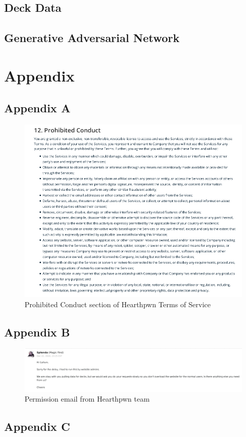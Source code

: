 \documentclass{report} %
\begin{document}
\section{Deck Data}
\section{Generative Adversarial Network}


\chapter{Appendix}
\section*{Appendix A}
\begin{figure}[h]
\centering
\includegraphics[width=1.25\textwidth]{ProhibitedConduct}
\captionsetup{labelformat=empty}
\caption{Prohibited Conduct section of Hearthpwn Terms of Service\protect}
 \label{board}
\end{figure}


\section*{Appendix B}
\begin{figure}[h]
\centering
\includegraphics[width=1.25\textwidth]{permission}
\captionsetup{labelformat=empty}
\caption{Permission email from Hearthpwn team\protect\footnotemark}
 \label{board}
\end{figure}

\section*{Appendix C}


\end{document}
